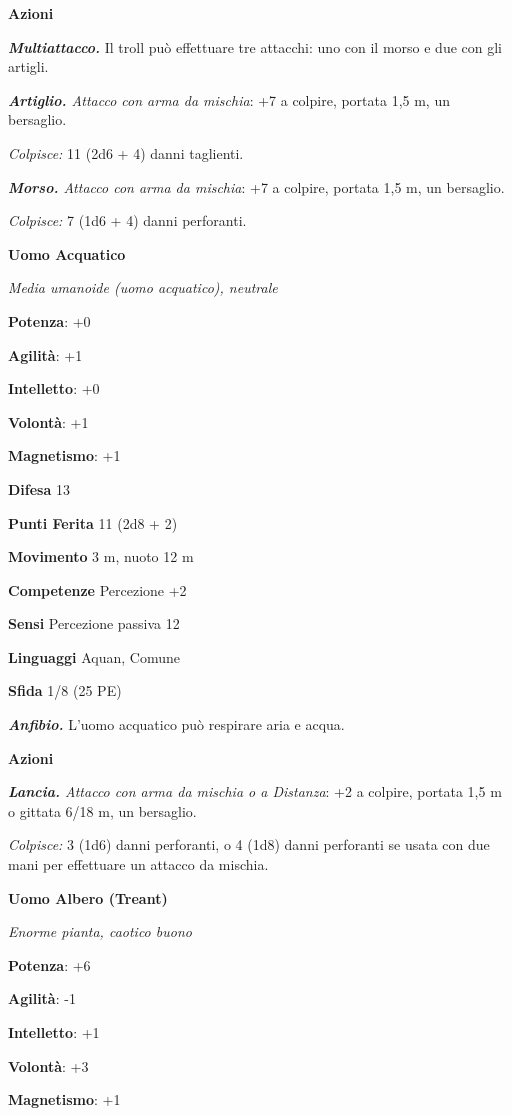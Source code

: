 \begin{multicols}{2}
\textbf{Azioni}

\emph{\textbf{Multiattacco.}} Il troll può effettuare tre attacchi: uno
con il morso e due con gli artigli.

\emph{\textbf{Artiglio.} Attacco con arma da mischia}: +7 a colpire,
portata 1,5 m, un bersaglio.

\emph{Colpisce:} 11 (2d6 + 4) danni taglienti.

\emph{\textbf{Morso.} Attacco con arma da mischia}: +7 a colpire,
portata 1,5 m, un bersaglio.

\emph{Colpisce:} 7 (1d6 + 4) danni perforanti.

\textbf{Uomo Acquatico}

\emph{Media umanoide (uomo acquatico), neutrale}

\textbf{Potenza}: +0

\textbf{Agilità}: +1

\textbf{Intelletto}: +0

\textbf{Volontà}: +1

\textbf{Magnetismo}: +1

\textbf{Difesa} 13

\textbf{Punti Ferita} 11 (2d8 + 2)

\textbf{Movimento} 3 m, nuoto 12 m

\textbf{Competenze} Percezione +2

\textbf{Sensi} Percezione passiva 12

\textbf{Linguaggi} Aquan, Comune

\textbf{Sfida} 1/8 (25 PE)

\emph{\textbf{Anfibio.}} L'uomo acquatico può respirare aria e acqua.

\textbf{Azioni}

\emph{\textbf{Lancia.} Attacco con arma da mischia o a Distanza}: +2 a
colpire, portata 1,5 m o gittata 6/18 m, un bersaglio.

\emph{Colpisce:} 3 (1d6) danni perforanti, o 4 (1d8) danni perforanti se
usata con due mani per effettuare un attacco da mischia.

\textbf{Uomo Albero (Treant)}

\emph{Enorme pianta, caotico buono}

\textbf{Potenza}: +6

\textbf{Agilità}: -1

\textbf{Intelletto}: +1

\textbf{Volontà}: +3

\textbf{Magnetismo}: +1


\end{multicols}
